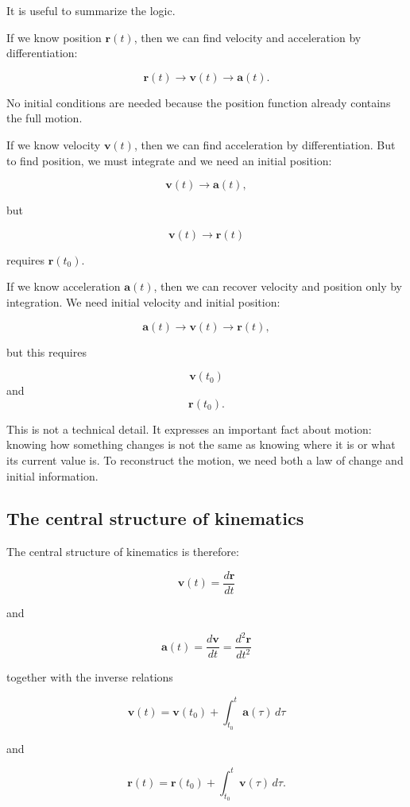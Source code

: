 It is useful to summarize the logic.

If we know position \(\mathbf{r}(t)\), then we can find velocity and acceleration by differentiation:

\[
\mathbf{r}(t)
\longrightarrow
\mathbf{v}(t)
\longrightarrow
\mathbf{a}(t).
\]

No initial conditions are needed because the position function already contains the full motion.

If we know velocity \(\mathbf{v}(t)\), then we can find acceleration by differentiation. But to find position, we must integrate and we need an initial position:

\[
\mathbf{v}(t)
\longrightarrow
\mathbf{a}(t),
\]

but

\[
\mathbf{v}(t)
\longrightarrow
\mathbf{r}(t)
\]

requires \(\mathbf{r}(t_0)\).

If we know acceleration \(\mathbf{a}(t)\), then we can recover velocity and position only by integration. We need initial velocity and initial position:

\[
\mathbf{a}(t)
\longrightarrow
\mathbf{v}(t)
\longrightarrow
\mathbf{r}(t),
\]

but this requires

\[
\mathbf{v}(t_0)
\]
and
\[
\mathbf{r}(t_0).
\]

This is not a technical detail. It expresses an important fact about motion: knowing how something changes is not the same as knowing where it is or what its current value is. To reconstruct the motion, we need both a law of change and initial information.

\subsection{The central structure of kinematics}

The central structure of kinematics is therefore:

\[
\boxed{
\mathbf{v}(t)=\frac{d\mathbf{r}}{dt}
}
\]

and

\[
\boxed{
\mathbf{a}(t)=\frac{d\mathbf{v}}{dt}
=
\frac{d^2\mathbf{r}}{dt^2}
}
\]

together with the inverse relations

\[
\boxed{
\mathbf{v}(t)
=
\mathbf{v}(t_0)+\int_{t_0}^{t}\mathbf{a}(\tau)\,d\tau
}
\]

and

\[
\boxed{
\mathbf{r}(t)
=
\mathbf{r}(t_0)+\int_{t_0}^{t}\mathbf{v}(\tau)\,d\tau
}.
\]

